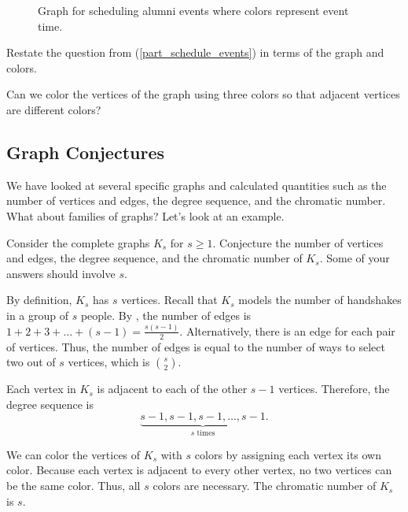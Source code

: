 \begin{exam}
\begin{apart}
\begin{soln}
                \begin{figure}[hbtp]
                    \centering
                    
                    \caption{Graph for scheduling alumni events where colors represent event time.}
                    \label{fig_schedule_alumni_colors}
                \end{figure}
            \end{soln}
        \item Restate the question from (\ref{part_schedule_events}) in terms of the graph and colors.
            \begin{soln}
                Can we color the vertices of the graph using three colors so that adjacent vertices are different colors?
            \end{soln}        
    \end{apart}   
\end{exam}

\newcommand{\subgraphconj}{Graph Conjectures}
\subsection{\subgraphconj}
\label{sub_graph_conj}

We have looked at several specific graphs and calculated quantities such as the number of vertices and edges, the degree sequence, and the chromatic number.  What about families of graphs?  Let's look at an example.

\begin{exam}
\label{exam_graph_conj_Ks}
    Consider the complete graphs $K_s$ for $s \ge 1$.  Conjecture the number of vertices and edges, the degree sequence, and the chromatic number of $K_s$. Some of your answers should involve $s$.  
        \begin{soln}
            By definition, $K_s$ has $s$ vertices.  Recall that $K_s$ models the number of handshakes in a group of $s$ people.  By , the number of edges is $1+2+3+\ldots+(s-1) = \frac{s(s-1)}{2}$.  Alternatively, there is an edge for each pair of vertices. Thus, the number of edges is equal to the number of ways to select two out of $s$ vertices, which is $\binom{s}{2}$.

            Each vertex in $K_s$ is adjacent to each of the other $s-1$ vertices. Therefore, the degree sequence is
                $$\underbrace{s-1,s-1,s-1, \ldots, s-1}_{s \text{ times}}.$$

            We can color the vertices of $K_s$ with $s$ colors by assigning each vertex its own color.  Because each vertex is adjacent to every other vertex, no two vertices can be the same color.  Thus, all $s$ colors are necessary.  The chromatic number of $K_s$ is $s$.
        \end{soln}
\end{exam}

